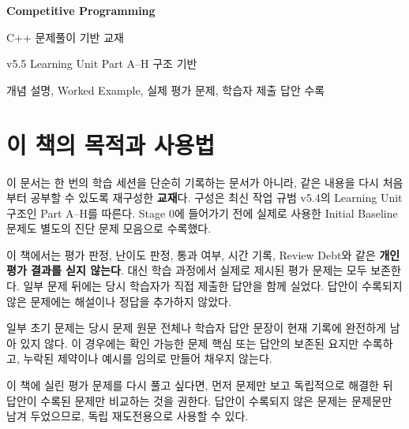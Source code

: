 \frontmatter
\begin{titlepage}
  \centering
  \vspace*{2.2cm}
  {\Huge\bfseries Competitive Programming\par}
  \vspace{0.35cm}
  {\LARGE C++ 문제풀이 기반 교재\par}
  \vspace{1.2cm}
  {\large v5.5 Learning Unit Part A--H 구조 기반\par}
  \vfill
  {\large 개념 설명, Worked Example, 실제 평가 문제, 학습자 제출 답안 수록\par}
  \vspace{1.0cm}
\end{titlepage}

\chapter*{이 책의 목적과 사용법}
이 문서는 한 번의 학습 세션을 단순히 기록하는 문서가 아니라, 같은 내용을 다시 처음부터 공부할 수 있도록 재구성한 \textbf{교재}다. 구성은 최신 작업 규범 v5.4의 Learning Unit 구조인 Part A--H를 따른다. Stage 0에 들어가기 전에 실제로 사용한 Initial Baseline 문제도 별도의 진단 문제 모음으로 수록했다.

이 책에서는 평가 판정, 난이도 판정, 통과 여부, 시간 기록, Review Debt와 같은 \textbf{개인 평가 결과를 싣지 않는다}. 대신 학습 과정에서 실제로 제시된 평가 문제는 모두 보존한다. 일부 문제 뒤에는 당시 학습자가 직접 제출한 답안을 함께 실었다. 답안이 수록되지 않은 문제에는 해설이나 정답을 추가하지 않았다.

\begin{notebox}[자료 보존 원칙]
일부 초기 문제는 당시 문제 원문 전체나 학습자 답안 문장이 현재 기록에 완전하게 남아 있지 않다. 이 경우에는 확인 가능한 문제 핵심 또는 답안의 보존된 요지만 수록하고, 누락된 제약이나 예시를 임의로 만들어 채우지 않는다.
\end{notebox}

\begin{keybox}[평가 문제를 풀 때의 기본 원칙]
이 책에 실린 평가 문제를 다시 풀고 싶다면, 먼저 문제만 보고 독립적으로 해결한 뒤 답안이 수록된 문제만 비교하는 것을 권한다. 답안이 수록되지 않은 문제는 문제문만 남겨 두었으므로, 독립 재도전용으로 사용할 수 있다.
\end{keybox}

